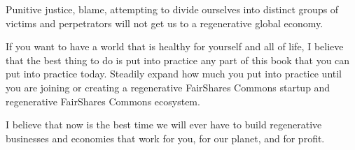 Punitive justice, blame, attempting to divide ourselves into distinct groups of victims and perpetrators will not get us to a regenerative global economy.


If you want to have a world that is healthy for yourself and all of life, I believe that the best thing to do is put into practice any part of this book that you can put into practice today. Steadily expand how much you put into practice until you are joining or creating a regenerative FairShares Commons startup and regenerative FairShares Commons ecosystem.


I believe that now is the best time we will ever have to build regenerative businesses and economies that work for you, for our planet, and for profit.